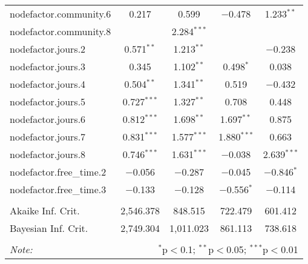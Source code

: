 \documentclass[11pt]{article}
\begin{document}
\begin{table}[!htbp]
\begin{tabular}{@{\extracolsep{5pt}}lcccc}
  nodefactor.community.6 & 0.217 & 0.599 & $-$0.478 & 1.233$^{**}$ \\ 
  nodefactor.community.8 &  & 2.284$^{***}$ &  &  \\ 
  nodefactor.jours.2 & 0.571$^{**}$ & 1.213$^{**}$ &  & $-$0.238 \\ 
  nodefactor.jours.3 & 0.345 & 1.102$^{**}$ & 0.498$^{*}$ & 0.038 \\ 
  nodefactor.jours.4 & 0.504$^{**}$ & 1.341$^{**}$ & 0.519 & $-$0.432 \\ 
  nodefactor.jours.5 & 0.727$^{***}$ & 1.327$^{**}$ & 0.708 & 0.448 \\ 
  nodefactor.jours.6 & 0.812$^{***}$ & 1.698$^{**}$ & 1.697$^{**}$ & 0.875 \\ 
  nodefactor.jours.7 & 0.831$^{***}$ & 1.577$^{***}$ & 1.880$^{***}$ & 0.663 \\ 
  nodefactor.jours.8 & 0.746$^{***}$ & 1.631$^{***}$ & $-$0.038 & 2.639$^{***}$ \\ 
  nodefactor.free\_time.2 & $-$0.056 & $-$0.287 & $-$0.045 & $-$0.846$^{*}$ \\ 
  nodefactor.free\_time.3 & $-$0.133 & $-$0.128 & $-$0.556$^{*}$ & $-$0.114 \\ 
 \hline \\[-1.8ex] 
Akaike Inf. Crit. & 2,546.378 & 848.515 & 722.479 & 601.412 \\ 
Bayesian Inf. Crit. & 2,749.304 & 1,011.023 & 861.113 & 738.618 \\ 
\hline 
\hline \\[-1.8ex] 
\textit{Note:}  & \multicolumn{4}{r}{$^{*}$p$<$0.1; $^{**}$p$<$0.05; $^{***}$p$<$0.01} \\ 
\end{tabular} 
\end{table}
\end{document}
